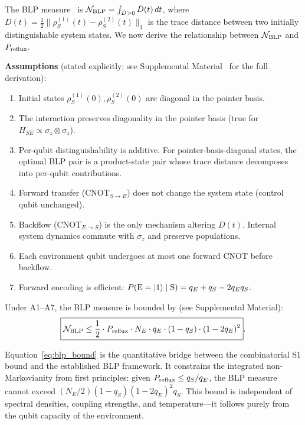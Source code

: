 \documentclass[aps,prl,twocolumn,superscriptaddress,hyperref]{revtex4-2}
\begin{document}
The BLP measure~\cite{Breuer:2009} is $\mathcal{N}_{\rm BLP} = \int_{\dot{D}>0} \dot{D}(t)\,dt$, where $D(t) = \frac{1}{2}\|\rho_S^{(1)}(t) - \rho_S^{(2)}(t)\|_1$ is the trace distance between two initially distinguishable system states. We now derive the relationship between $\mathcal{N}_{\rm BLP}$ and $P_{\rm reflux}$.

\textbf{Assumptions} (stated explicitly; see Supplemental Material~\cite{SM} for the full derivation):
\begin{enumerate}
    \item[A1.] Initial states $\rho_S^{(1)}(0), \rho_S^{(2)}(0)$ are diagonal in the pointer basis.
    \item[A2.] The interaction preserves diagonality in the pointer basis (true for $H_{SE} \propto \sigma_z \otimes \sigma_z$).
    \item[A3.] Per-qubit distinguishability is additive. For pointer-basis-diagonal states, the optimal BLP pair is a product-state pair whose trace distance decomposes into per-qubit contributions.
    \item[A4.] Forward transfer (CNOT$_{S \to E}$) does not change the system state (control qubit unchanged).
    \item[A5.] Backflow (CNOT$_{E \to S}$) is the only mechanism altering $D(t)$. Internal system dynamics commute with $\sigma_z$ and preserve populations.
    \item[A6.] Each environment qubit undergoes at most one forward CNOT before backflow.
    \item[A7.] Forward encoding is efficient: $P({\rm E}=|1\rangle \mid {\rm S}) = q_E + q_S - 2q_E q_S$.
\end{enumerate}

Under A1--A7, the BLP measure is bounded by (see Supplemental Material):
\begin{equation}
\boxed{\mathcal{N}_{\rm BLP} \leq \frac{1}{2} \cdot P_{\rm reflux} \cdot N_E \cdot q_E \cdot (1 - q_S) \cdot (1 - 2q_E)^2}.
\label{eq:blp_bound}
\end{equation}

Equation~\eqref{eq:blp_bound} is the quantitative bridge between the combinatorial S1 bound and the established BLP framework. It constrains the integrated non-Markovianity from first principles: given $P_{\rm reflux} \leq q_S/q_E$, the BLP measure cannot exceed $(N_E/2)(1-q_S)(1-2q_E)^2 q_S$. This bound is independent of spectral densities, coupling strengths, and temperature---it follows purely from the qubit capacity of the environment.
\end{document}
